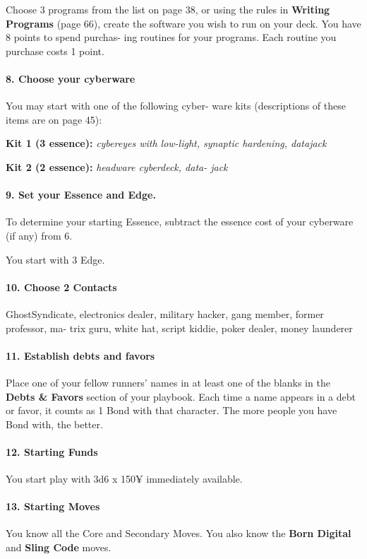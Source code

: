 \begin{multicols}{3}
Choose 3 programs from the list on page 38,
or using the rules in \textbf{Writing Programs} (page
66), create the software you wish to run on
your deck. You have 8 points to spend purchas-
ing routines for your programs. Each routine you
purchase costs 1 point.



\paragraph{8.  Choose your cyberware}

You may start with one of the following cyber-
ware kits (descriptions of these items are on
page 45):

\textbf{Kit 1 (3 essence):} \textit{cybereyes with low-light,
synaptic hardening, datajack}

\textbf{Kit 2 (2 essence):} \textit{headware cyberdeck, data-
jack}


\paragraph{9.  Set your Essence and Edge.}

To determine your starting Essence, subtract the
essence cost of your cyberware (if any) from 6.

You start with 3 Edge.

\paragraph{10.  Choose 2 Contacts}

GhostSyndicate, electronics dealer, military
hacker, gang member, former professor, ma-
trix guru, white hat, script kiddie, poker dealer,
money launderer

\paragraph{11.  Establish debts and favors}

Place one of your fellow runners’ names in at
least one of the blanks in the \textbf{Debts \& Favors}
section of your playbook. Each time a name
appears in a debt or favor, it counts as 1 Bond
with that character. The more people you have
Bond with, the better.

\paragraph{12.  Starting Funds}

You start play with 3d6 x 150¥ immediately
available.

\paragraph{13.  Starting Moves}

You know all the Core and Secondary Moves.
You also know the \textbf{Born Digital} and \textbf{Sling
Code} moves.

\end{multicols}

